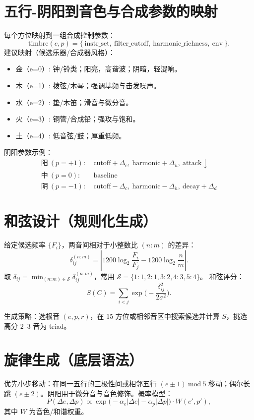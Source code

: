 \documentclass{article}
\begin{document}
\section{五行-阴阳到音色与合成参数的映射}
每个方位映射到一组合成控制参数：
\[
\mathrm{timbre}(e,p)=\{\ \mathrm{instr\_set},\ \mathrm{filter\_cutoff},\ \mathrm{harmonic\_richness},\ \mathrm{env}\ \}.
\]
建议映射（候选乐器/合成器风格）：
\begin{itemize}
  \item 金（e=0）: 钟/铃类；阳亮，高谐波；阴暗，轻混响。
  \item 木（e=1）: 拨弦/木琴；强调基频与击发噪声。
  \item 水（e=2）: 垫/木笛；滑音与微分音。
  \item 火（e=3）: 铜管/合成铅；强攻与饱和。
  \item 土（e=4）: 低音弦/鼓；厚重低频。
\end{itemize}
阴阳参数示例：
\[
\begin{array}{ll}
\text{阳}\ (p=+1):& \ \text{cutoff}+\Delta_c,\ \text{harmonic}+\Delta_h,\ \text{attack}\downarrow\\[2pt]
\text{中}\ (p=0):&\ \text{baseline}\\[2pt]
\text{阴}\ (p=-1):&\ \text{cutoff}-\Delta_c,\ \text{harmonic}-\Delta_h,\ \text{decay}+\Delta_d
\end{array}
\]

\section{和弦设计（规则化生成）}
给定候选频率 $\{F_i\}$，两音间相对于小整数比 $(n:m)$ 的差异：
\[
\delta_{ij}^{(n:m)}=\left|1200\log_2\frac{F_i}{F_j}-1200\log_2\frac{n}{m}\right|.
\]
取 $\delta_{ij}=\min_{(n:m)\in\mathcal{S}}\delta_{ij}^{(n:m)}$，常用 $\mathcal{S}=\{1:1,2:1,3:2,4:3,5:4\}$。
和弦评分：
\[
S(C)=\sum_{i<j}\exp\!\Big(-\frac{\delta_{ij}^2}{2\sigma^2}\Big).
\]

生成策略：选根音 $(e,p,r)$，在 15 方位或相邻音区中搜索候选并计算 $S$，挑选高分 2--3 音为 triad。

\section{旋律生成（底层语法）}
优先小步移动：在同一五行的三极性间或相邻五行 $(e\pm1)\ \mathrm{mod}\ 5$ 移动；偶尔长跳 $(e\pm2)$。阴阳用于微分音与音色修饰。概率模型：
\[
P(\Delta e,\Delta p)\propto \exp\!\big(-\alpha_e|\Delta e|-\alpha_p|\Delta p|\big)\cdot W(e',p'),
\]
其中 $W$ 为音色/和谐权重。
\end{document}
